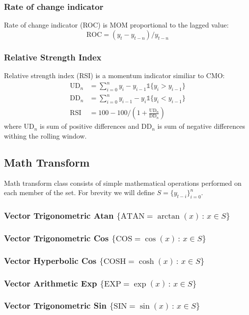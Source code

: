 \subsubsection{Rate of change indicator}
Rate of change indicator (ROC) is MOM proportional to the lagged value:
    \[ \text{ROC} = (y_t-y_{t-n}) / y_{t-n} \]
\subsubsection{Relative Strength Index}
Relative strength index (RSI) is a momentum indicator similiar to CMO:
    \begin{align*}
        \text{UD}_{n} &= \sum_{i=0}^{n} y_i - y_{i-1}\mathbb{1}\{y_i > y_{i-1}\} \\
        \text{DD}_{n} &= \sum_{i=0}^{n} y_{i-1} - y_{i}\mathbb{1}\{y_i < y_{i-1}\} \\
        \text{RSI} &= 100 - 100/\left(1+\frac{\text{UD}_{n}}{\text{DD}_{n}}\right)
    \end{align*}
where $\text{UD}_{n}$ is sum of positive differences and $\text{DD}_{n}$ is sum of negative differences withing the rolling window.
\hspace{1cm}
\subsection{Math Transform}
Math transform class consists of simple mathematical operations performed on each member of the set. For brevity we will define $S = \{ y_{t-i} \}_{i=0}^{n}$.
\subsubsection{Vector Trigonometric Atan $\{\text{ATAN}=\arctan(x) \,:\, x \in S \}$} 
\subsubsection{Vector Trigonometric Cos $\{\text{COS}=\cos(x) \,:\, x \in S \}$}
\subsubsection{Vector Hyperbolic Cos $\{\text{COSH}=\cosh(x) \,:\, x \in S \}$}
\subsubsection{Vector Arithmetic Exp $\{\text{EXP}=\exp(x) \,:\, x \in S \}$}
\subsubsection{Vector Trigonometric Sin $\{\text{SIN}=\sin(x) \,:\, x \in S \}$}
